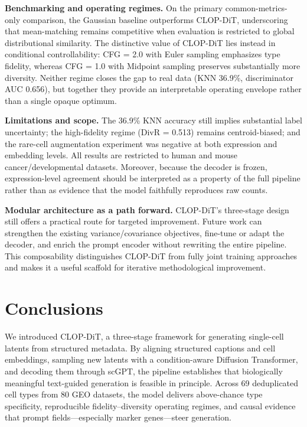 \documentclass[genes,article,submit,pdftex,oneauthor]{Definitions/mdpi}
\begin{document}
\textbf{Benchmarking and operating regimes.} On the primary common-metrics-only comparison, the Gaussian baseline outperforms CLOP-DiT, underscoring that mean-matching remains competitive when evaluation is restricted to global distributional similarity. The distinctive value of CLOP-DiT lies instead in conditional controllability: CFG = 2.0 with Euler sampling emphasizes type fidelity, whereas CFG = 1.0 with Midpoint sampling preserves substantially more diversity. Neither regime closes the gap to real data (KNN 36.9\%, discriminator AUC 0.656), but together they provide an interpretable operating envelope rather than a single opaque optimum.

\textbf{Limitations and scope.} The 36.9\% KNN accuracy still implies substantial label uncertainty; the high-fidelity regime (DivR = 0.513) remains centroid-biased; and the rare-cell augmentation experiment was negative at both expression and embedding levels. All results are restricted to human and mouse cancer/developmental datasets. Moreover, because the decoder is frozen, expression-level agreement should be interpreted as a property of the full pipeline rather than as evidence that the model faithfully reproduces raw counts.

\textbf{Modular architecture as a path forward.} CLOP-DiT's three-stage design still offers a practical route for targeted improvement. Future work can strengthen the existing variance/covariance objectives, fine-tune or adapt the decoder, and enrich the prompt encoder without rewriting the entire pipeline. This composability distinguishes CLOP-DiT from fully joint training approaches~\cite{ref-scdesign3} and makes it a useful scaffold for iterative methodological improvement.

\section{Conclusions}\label{sec:conclusions}

We introduced CLOP-DiT, a three-stage framework for generating single-cell latents from structured metadata. By aligning structured captions and cell embeddings, sampling new latents with a condition-aware Diffusion Transformer, and decoding them through scGPT, the pipeline establishes that biologically meaningful text-guided generation is feasible in principle. Across 69 deduplicated cell types from 80 GEO datasets, the model delivers above-chance type specificity, reproducible fidelity--diversity operating regimes, and causal evidence that prompt fields---especially marker genes---steer generation.
\end{document}

